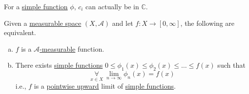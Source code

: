 \begin{prev}
	For a \hyperref[def:simple-function]{simple function} \(\phi\), \(c_{i}\) can actually be in \(\mathbb{C} \).
\end{prev}

\begin{theorem}
	Given a \hyperref[def:measurable-space]{measurable space} \((X, \mathcal{A} )\) and let \(f\colon X\to [0, \infty ]\), the following are equivalent.
	\begin{enumerate}[(a)]
		\item \(f\) is a \hyperref[def:A-measurable-function]{\(\mathcal{A} \)-measurable} function.
		\item There exists \hyperref[def:simple-function]{simple functions} \(0\leq \phi_1(x)\leq \phi_2(x)\leq \dots \leq f(x) \) such that
		      \[
			      \underset{x\in X}{\forall }\ \lim_{n \to \infty} \phi _{n}(x) = f(x)
		      \]
		      i.e., \(f\) is a \underline{\hyperref[def:pointwise-convergence]{pointwise} upward} limit of \hyperref[def:simple-function]{simple functions}.
	\end{enumerate}
\end{theorem}
